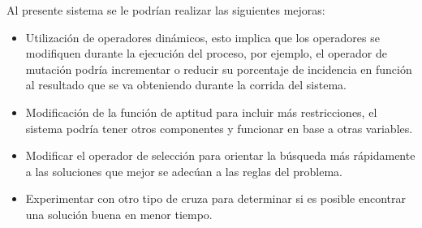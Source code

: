 \documentclass[pdftex,a4paper,10.5pt]{article}
\begin{document}
Al presente sistema se le podrían realizar las siguientes mejoras:

\begin{itemize}

\item  Utilizaci\'on de operadores din\'amicos, esto implica que los operadores se modifiquen durante
la ejecuci\'on del proceso, por ejemplo, el operador de mutaci\'on podr\'ia incrementar o reducir
su porcentaje de incidencia en funci\'on al resultado que se va obteniendo durante la corrida
del sistema.
\item Modificaci\'on de la funci\'on de aptitud para incluir m\'as restricciones, el sistema podr\'ia tener otros componentes y funcionar en base a otras variables. 
\item Modificar el operador de selecci\'on para orientar la b\'usqueda m\'as r\'apidamente a las soluciones que mejor se adec\'uan a las reglas del problema.
\item Experimentar con otro tipo de cruza para determinar si es posible encontrar una soluci\'on buena en menor tiempo.

\end{itemize}
\newpage
\end{document}
